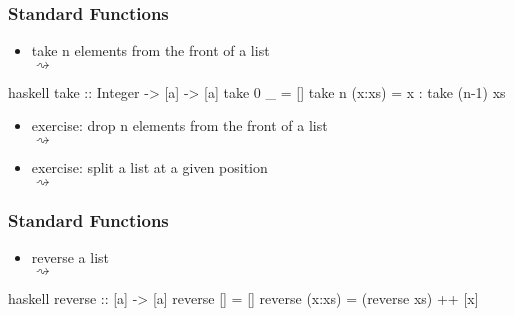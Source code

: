 \documentclass[dvipsnames]{beamer}
\theoremstyle{plain}
\begin{document}
\begin{frame}[fragile]
  \frametitle{Standard Functions}

  \begin{itemize}
    \item take n elements from the front of a list\\
       $\rightsquigarrow$
  \end{itemize}

  \begin{exampleblock}{}
    \begin{pygments}{haskell}
take :: Integer -> [a] -> [a]
take 0 _      = []
take n (x:xs) = x : take (n-1) xs
    \end{pygments}
  \end{exampleblock}

  \pause
  \begin{itemize}
    \item exercise: drop n elements from the front of a list\\
       $\rightsquigarrow$
    \item exercise: split a list at a given position\\
       $\rightsquigarrow$
  \end{itemize}
\end{frame}

\begin{frame}[fragile]
  \frametitle{Standard Functions}

  \begin{itemize}
    \item reverse a list\\
       $\rightsquigarrow$
  \end{itemize}

  \begin{exampleblock}{}
    \begin{pygments}{haskell}
reverse :: [a] -> [a]
reverse []     = []
reverse (x:xs) = (reverse xs) ++ [x]
    \end{pygments}
  \end{exampleblock}
\end{frame}
\end{document}
